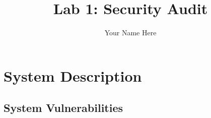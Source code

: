 \documentclass[11pt]{article}
\begin{document}
\author{Your Name Here}
\title{Lab 1: Security Audit}
\maketitle

\section{System Description}

\subsection{System Vulnerabilities}
\end{document}
